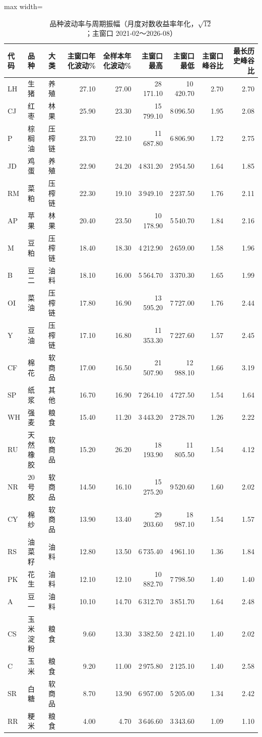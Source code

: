 \begin{table}[htbp]
\centering
\small
\caption{品种波动率与周期振幅（月度对数收益率年化，$\sqrt{12}$；主窗口 2021-02～2026-08）}
\label{tab:vol}
\begin{adjustbox}{max width=\textwidth}
\begin{tabular}{@{}lllrrrrrr@{}}
\toprule
代码 & 品种 & 大类 & 主窗口年化波动\% & 全样本年化波动\% & 主窗口最高 & 主窗口最低 & 主窗口峰谷比 & 最长历史峰谷比 \\
\midrule
LH & 生猪 & 养殖 & 27.10 & 27.00 & 28\,171.10 & 10\,420.70 & 2.70 & 2.70 \\
CJ & 红枣 & 林果 & 25.90 & 23.30 & 15\,799.10 & 8\,096.50 & 1.95 & 2.08 \\
P & 棕榈油 & 压榨链 & 23.70 & 22.10 & 11\,687.80 & 6\,806.90 & 1.72 & 2.75 \\
JD & 鸡蛋 & 养殖 & 22.90 & 24.20 & 4\,831.20 & 2\,954.50 & 1.64 & 1.85 \\
RM & 菜粕 & 压榨链 & 22.30 & 19.10 & 3\,949.10 & 2\,237.50 & 1.76 & 2.11 \\
AP & 苹果 & 林果 & 20.40 & 23.50 & 10\,178.90 & 5\,540.70 & 1.84 & 2.16 \\
M & 豆粕 & 压榨链 & 18.40 & 18.30 & 4\,212.90 & 2\,659.00 & 1.58 & 1.96 \\
B & 豆二 & 油料 & 18.10 & 16.00 & 5\,564.70 & 3\,370.30 & 1.65 & 1.99 \\
OI & 菜油 & 压榨链 & 17.80 & 16.90 & 13\,595.20 & 7\,727.00 & 1.76 & 2.44 \\
Y & 豆油 & 压榨链 & 17.10 & 16.80 & 11\,353.30 & 7\,227.60 & 1.57 & 2.45 \\
CF & 棉花 & 软商品 & 17.00 & 16.50 & 21\,507.90 & 12\,988.10 & 1.66 & 3.19 \\
SP & 纸浆 & 其他 & 16.70 & 16.90 & 7\,264.10 & 4\,727.50 & 1.54 & 1.64 \\
WH & 强麦 & 粮食 & 15.40 & 11.20 & 3\,443.20 & 2\,728.70 & 1.26 & 2.22 \\
RU & 天然橡胶 & 软商品 & 15.20 & 26.20 & 18\,193.90 & 11\,805.50 & 1.54 & 4.12 \\
NR & 20号胶 & 软商品 & 14.50 & 16.10 & 15\,275.20 & 9\,520.60 & 1.60 & 2.02 \\
CY & 棉纱 & 软商品 & 13.90 & 13.40 & 29\,203.60 & 18\,987.10 & 1.54 & 1.57 \\
RS & 油菜籽 & 油料 & 12.80 & 13.50 & 6\,735.40 & 4\,961.10 & 1.36 & 1.84 \\
PK & 花生 & 油料 & 12.10 & 12.10 & 10\,882.70 & 7\,798.50 & 1.40 & 1.40 \\
A & 豆一 & 油料 & 10.10 & 14.70 & 6\,312.70 & 3\,851.70 & 1.64 & 2.48 \\
CS & 玉米淀粉 & 粮食 & 9.60 & 13.30 & 3\,382.50 & 2\,421.10 & 1.40 & 2.02 \\
C & 玉米 & 粮食 & 9.20 & 11.00 & 2\,975.80 & 2\,125.10 & 1.40 & 2.58 \\
SR & 白糖 & 软商品 & 8.70 & 13.90 & 6\,957.00 & 5\,205.00 & 1.34 & 2.42 \\
RR & 粳米 & 粮食 & 4.00 & 4.70 & 3\,646.60 & 3\,343.60 & 1.09 & 1.10 \\
\bottomrule
\end{tabular}
\end{adjustbox}
\end{table}
